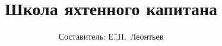 \author{\LARGE Составитель: Е.\=,П.~Леонтьев}
\title{Школа яхтенного капитана}
\titlefoot{\theyear}
\maketitle
